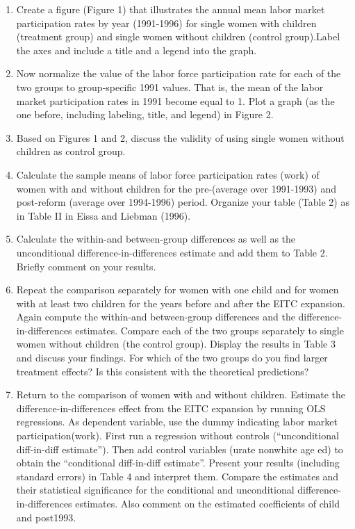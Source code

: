 \documentclass{article}
\begin{document}
\begin{enumerate}[label=\alph*]
\item  Create a figure (Figure 1) that illustrates the annual mean labor market participation rates by year (1991-1996) for single women with children (treatment group) and single women without children (control group).Label the axes and include a title and a legend into the graph.

\item Now normalize the value of the labor force participation rate for each of the two groups to group-specific 1991 values. That is, the mean of the labor  market participation rates in 1991 become equal to 1. Plot a graph (as the one before, including labeling, title, and legend) in Figure 2.

\item  Based on Figures 1 and 2, discuss the validity of using single women without children as control group.

\item Calculate the sample means of labor force participation rates (work) of women with and without children for the pre-(average over 1991-1993) and post-reform (average over 1994-1996) period. Organize your table (Table 2) as in Table II in Eissa and Liebman (1996).

\item Calculate the within-and between-group differences as well as the unconditional difference-in-differences estimate and add them to Table 2. Briefly comment on your results.

\item  Repeat the comparison separately for women with one child and for women with at least two children for the years before and after the EITC expansion. Again compute the within-and between-group differences and the difference-in-differences estimates. Compare each of the two groups separately to single women without children (the control group). Display the results in Table 3 and discuss your findings. For which of the two groups do you find larger treatment effects? Is this consistent with the theoretical predictions?

\item Return to the comparison of women with and without children. Estimate the difference-in-differences effect from the EITC expansion by running OLS regressions. As dependent variable, use the dummy indicating labor market participation(work). First run a regression without controls (“unconditional diff-in-diff estimate”). Then add control variables (urate nonwhite age ed) to obtain the “conditional diff-in-diff estimate”. Present your results (including standard errors) in Table 4 and interpret them. Compare the estimates and their statistical significance for the conditional and unconditional difference-in-differences estimates. Also comment on the estimated coefficients of child and post1993.


\end{enumerate}
\end{document}
